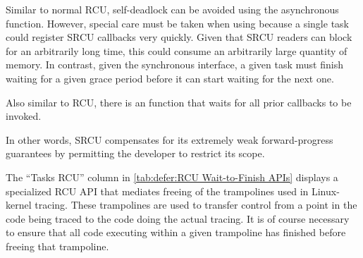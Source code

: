 \QuickQuizEnd

Similar to normal RCU, self-deadlock can be avoided using the
asynchronous  function.
However, special care must be taken when using  because
a single task could register SRCU callbacks very quickly.
Given that SRCU readers can block for an arbitrarily long
time, this could consume an arbitrarily large quantity of memory.
In contrast, given the synchronous 
interface, a given task must finish waiting for a given grace period
before it can start waiting for the next one.

Also similar to RCU, there is an  function that waits
for all prior  callbacks to be invoked.

In other words, SRCU compensates for its extremely weak
forward-progress guarantees by permitting the developer to restrict
its scope.

The ``Tasks RCU'' column in
\cref{tab:defer:RCU Wait-to-Finish APIs} displays a specialized
RCU API that mediates freeing of the trampolines used in Linux-kernel
tracing.
These trampolines are used to transfer control from a point in the
code being traced to the code doing the actual tracing.
It is of course necessary to ensure that all code executing within
a given trampoline has finished before freeing that trampoline.


